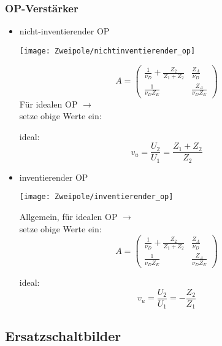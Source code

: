 \subsubsection{OP-Verstärker}
\begin{itemize}[leftmargin=*]
	\item nicht-inventierender OP\\
			\begin{minipage}{0.4\columnwidth}
				\texttt{[image: Zweipole/nichtinventierender\_op]}
			\end{minipage}
			\begin{minipage}{0.6\columnwidth}
				\begin{equation*}
					A = \begin{pmatrix}
						\frac{1}{\nu_D} + \frac{Z_2}{Z_1 + Z_2} & \frac{Z_A}{\nu_D} \\
						\frac{1}{\nu_D Z_E} & \frac{Z_A}{\nu_D Z_E}
					\end{pmatrix}
				\end{equation*}
			Für idealen OP $\rightarrow$ \\setze obige Werte ein:
			\end{minipage}
			ideal:
			\begin{equation*}
				v_u=\frac{U_2}{U_1}=\frac{Z_1+Z_2}{Z_2}
			\end{equation*}
	\item inventierender OP\\
	\begin{minipage}{0.4\columnwidth}
		\texttt{[image: Zweipole/inventierender\_op]}
	\end{minipage}
	\begin{minipage}{0.6\columnwidth}
		Allgemein, für idealen OP $\rightarrow$ \\setze obige Werte ein:
		\begin{equation*}
			A = \begin{pmatrix}
				\frac{1}{\nu_D} + \frac{Z_2}{Z_1 + Z_2} & \frac{Z_A}{\nu_D} \\
				\frac{1}{\nu_D Z_E} & \frac{Z_A}{\nu_D Z_E}
			\end{pmatrix}
		\end{equation*}
	\end{minipage}
			ideal:
	\begin{equation*}
		v_u=\frac{U_2}{U_1}=-\frac{Z_2}{Z_1}
	\end{equation*}
\end{itemize}

\subsection{Ersatzschaltbilder}
